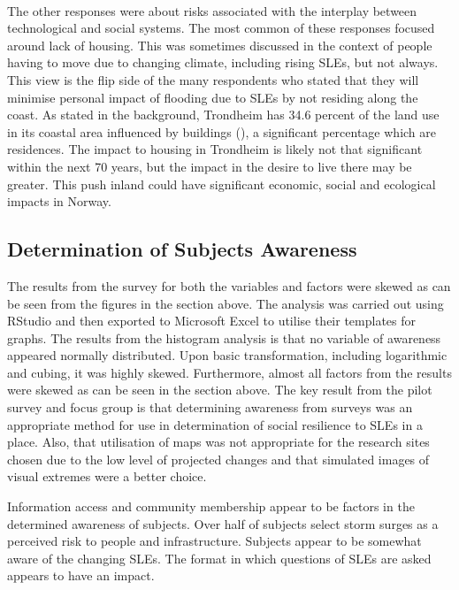 \paragraph{}
The other responses were about risks associated with the interplay between technological and social systems. The most common of these responses focused around lack of housing. This was sometimes discussed in the context of people having to move due to changing climate, including rising SLEs, but not always. This view is the flip side of the many respondents who stated that they will minimise personal impact of flooding due to SLEs by not residing along the coast.  As stated in the background, Trondheim has 34.6 percent of the land use in its coastal area influenced by buildings (\cite{engebakken_construction_2022}), a significant percentage which are residences. The impact to housing in Trondheim is likely not that significant within the next 70 years, but the impact in the desire to live there may be greater. This push inland could have significant economic, social and ecological impacts in Norway. 
\paragraph{}





\subsection{Determination of Subjects Awareness}
The results from the survey for both the variables and factors were skewed as can be seen from the figures in the section above. The analysis was carried out using RStudio and then exported to Microsoft Excel to utilise their templates for graphs. The results from the histogram analysis is that no variable of awareness appeared normally distributed. Upon basic transformation, including logarithmic and cubing, it was highly skewed. Furthermore, almost all factors from the results were skewed as can be seen in the section above. The key result from the pilot survey and focus group is that determining awareness from surveys was an appropriate method for use in determination of social resilience to SLEs in a place. Also, that utilisation of maps was not appropriate for the research sites chosen due to the low level of projected changes and that simulated images of visual extremes were a better choice.


Information access and community membership appear to be factors in the determined awareness of subjects. Over half of subjects select storm surges as a perceived risk to people and infrastructure. Subjects appear to be somewhat aware of the changing SLEs. The format in which questions of SLEs are asked appears to have an impact. 

